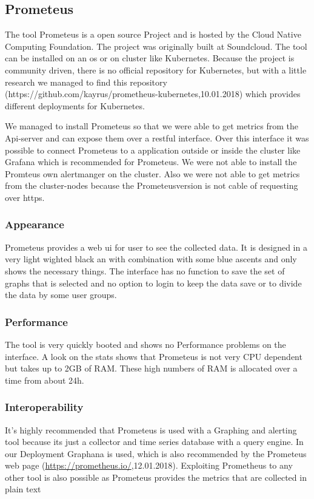 \subsection{Prometeus}
\label{Toolname} %
The tool Prometeus is a open source Project and is hosted by the Cloud Native Computing Foundation. The project was originally built at Soundcloud. The tool can be installed on an os or on cluster like Kubernetes. Because the project is community driven, there is no official repository for Kubernetes, but with a little research we managed to find this repository (https://github.com/kayrus/prometheus-kubernetes,10.01.2018) which provides different deployments for Kubernetes.

We managed to install Prometeus so that we were able to get metrics from the Api-server and can expose them over a restful interface. Over this interface it was possible to connect Prometeus to a application outside or inside the cluster like Grafana which is recommended for Prometeus. We were not able to install the Promteus own alertmanger on the cluster. Also we were not able to get metrics from the cluster-nodes because the Prometeusversion is not cable of requesting over https. 
\subsubsection{Appearance}%
Prometeus provides a web ui for user to see the collected data. It is designed in a very light wighted black an with combination with some blue ascents and only shows the necessary things. The interface has no function to save the set of graphs that is selected and no option to login to keep the data save or to divide the data by some user groups.   
\subsubsection{Performance}
The tool is very quickly booted and shows no Performance problems on the interface. A look on the stats shows that Prometeus is not very CPU dependent but takes up to 2GB of RAM. These high numbers of RAM is allocated over a time from about 24h. 
\subsubsection{Interoperability}
It's highly recommended that Prometeus is used with a Graphing and alerting tool because its just a collector and time series database with a query engine. In our Deployment Graphana is used, which is also recommended by the Prometeus web page (\url{https://prometheus.io/},12.01.2018). Exploiting Prometheus to any other tool is also possible as Prometeus provides the metrics that are collected in plain text
